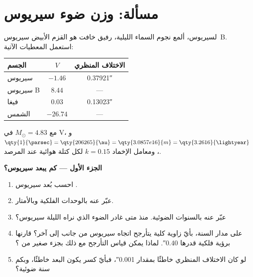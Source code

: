 \section{مسألة: وزن ضوء سيريوس}

\begin{problem}
\label{pb:b1:observing-the-sky:1}
لسيريوس، ألمع نجوم السماء الليلية، رفيق خافت هو القزم الأبيض سيريوس~B. استعمل المعطيات الآتية:
\begin{center}
\small
\begin{tabular}{lcc}
\hline
الجسم & $V$ & الاختلاف المنظري \\
\hline
سيريوس & $-1.46$ & \ang{;;0.37921} \\
سيريوس B & $8.44$ & --- \\
فيغا & $0.03$ & \ang{;;0.13023} \\
الشمس & $-26.74$ & --- \\
\hline
\end{tabular}
\end{center}
مع $M_\odot = 4.83$ في V، و$\qty{1}{\parsec} = \qty{206265}{\au} =
\qty{3.0857e16}{m} = \qty{3.2616}{\lightyear}$، ومعامل الإخماد $k = 0.15$ لكل كتلة هوائية عند المرصد.

\medskip
\noindent\textbf{الجزء الأول --- كم يبعد سيريوس؟}
\begin{enumerate}
  \item احسب بُعد سيريوس .
  \item عبّر عنه بالوحدات الفلكية وبالأمتار.
  \item عبّر عنه بالسنوات الضوئية. منذ متى غادر الضوء الذي نراه الليلة سيريوس؟
  \item على مدار السنة، بأيّ زاوية كلية يتأرجح اتجاه سيريوس من جانب إلى آخر؟ قارنها برؤية فلكية قدرها \ang{;;0.40}. لماذا يمكن قياس التأرجح مع ذلك بجزء صغير من ؟
  \item لو كان الاختلاف المنظري خاطئًا بمقدار \ang{;;0.001}، فبأيّ كسر يكون البعد خاطئًا، وبكم سنة ضوئية؟
\end{enumerate}


\end{problem}
